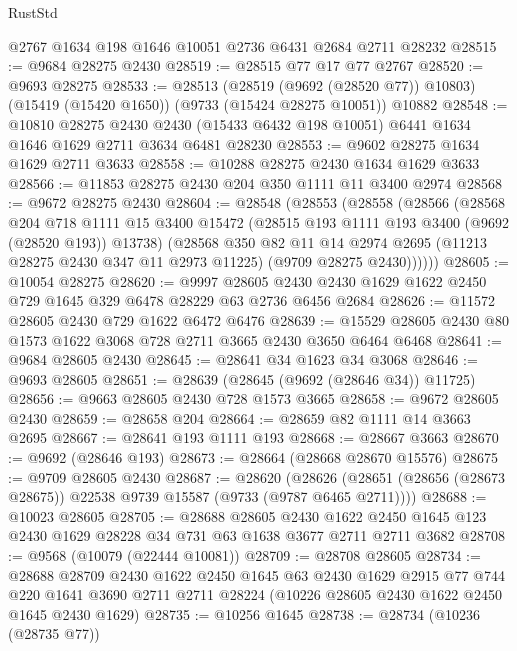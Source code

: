 \begin{lexlean}{RustStd}
\begin{coremodule}
{\begin{coremodule}
{{{{{{{{{{{{{{{{{{{{{{{{{{{{{{{{{{{{{{{{{{{{{{{{{{{{{{{    @2767
    @1634
    @198
    @1646
    @10051
    @2736
    @6431
    @2684
    @2711
    @28232
@28515 := @9684 @28275 @2430
@28519 := @28515 @77 @17 @77 @2767
@28520 := @9693 @28275
@28533 := @28513
    (@28519 (@9692 (@28520 @77)) @10803)
    (@15419 (@15420 @1650))
    (@9733 (@15424 @28275 @10051))
    @10882
@28548 := @10810
    @28275
    @2430
    @2430
    (@15433 @6432 @198 @10051)
    @6441
    @1634
    @1646
    @1629
    @2711
    @3634
    @6481
    @28230
@28553 := @9602 @28275 @1634 @1629 @2711 @3633
@28558 := @10288 @28275 @2430 @1634 @1629 @3633
@28566 := @11853 @28275 @2430 @204 @350 @1111 @11 @3400 @2974
@28568 := @9672 @28275 @2430
@28604 := @28548
    (@28553
      (@28558
        (@28566
          (@28568
            @204
            @718
            @1111
            @15
            @3400
            @15472
            (@28515 @193 @1111 @193 @3400 (@9692 (@28520 @193)) @13738)
            (@28568
              @350
              @82
              @11
              @14
              @2974
              @2695
              (@11213 @28275 @2430 @347 @11 @2973 @11225)
              (@9709 @28275 @2430))))))
@28605 := @10054 @28275
@28620 := @9997
    @28605
    @2430
    @2430
    @1629
    @1622
    @2450
    @729
    @1645
    @329
    @6478
    @28229
    @63
    @2736
    @6456
    @2684
@28626 := @11572 @28605 @2430 @729 @1622 @6472 @6476
@28639 := @15529 @28605 @2430 @80 @1573 @1622 @3068 @728 @2711 @3665 @2430 @3650 @6464 @6468
@28641 := @9684 @28605 @2430
@28645 := @28641 @34 @1623 @34 @3068
@28646 := @9693 @28605
@28651 := @28639 (@28645 (@9692 (@28646 @34)) @11725)
@28656 := @9663 @28605 @2430 @728 @1573 @3665
@28658 := @9672 @28605 @2430
@28659 := @28658 @204
@28664 := @28659 @82 @1111 @14 @3663 @2695
@28667 := @28641 @193 @1111 @193
@28668 := @28667 @3663
@28670 := @9692 (@28646 @193)
@28673 := @28664 (@28668 @28670 @15576)
@28675 := @9709 @28605 @2430
@28687 := @28620
    (@28626 (@28651 (@28656 (@28673 @28675)) @22538 @9739 @15587 (@9733 (@9787 @6465 @2711))))
@28688 := @10023 @28605
@28705 := @28688
    @28605
    @2430
    @1622
    @2450
    @1645
    @123
    @2430
    @1629
    @28228
    @34
    @731
    @63
    @1638
    @3677
    @2711
    @2711
    @3682
@28708 := @9568 (@10079 (@22444 @10081))
@28709 := @28708 @28605
@28734 := @28688
    @28709
    @2430
    @1622
    @2450
    @1645
    @63
    @2430
    @1629
    @2915
    @77
    @744
    @220
    @1641
    @3690
    @2711
    @2711
    @28224
    (@10226 @28605 @2430 @1622 @2450 @1645 @2430 @1629)
@28735 := @10256 @1645
@28738 := @28734 (@10236 (@28735 @77))
}}}}}}}}}}}}}}}}}}}}}}}}}}}}}}}}}}}}}}}}}}}}}}}}}}}}}}}
\end{coremodule}}
\end{coremodule}
\end{lexlean}
